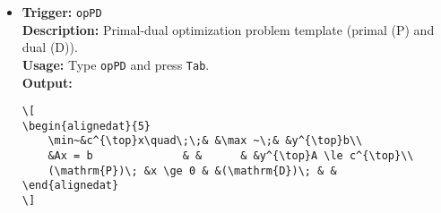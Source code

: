 \documentclass{article}
\begin{document}
\begin{itemize}[leftmargin=*, label={}]
\item \textbf{Trigger:} \texttt{opPD} \\
\textbf{Description:} Primal-dual optimization problem template (primal (P) and dual (D)). \\
\textbf{Usage:} Type \texttt{opPD} and press \texttt{Tab}. \\
\textbf{Output:}
\begin{verbatim}
\[
\begin{alignedat}{5}
    \min~&c^{\top}x\quad\;\;& &\max ~\;& &y^{\top}b\\
    &Ax = b              & &      & &y^{\top}A \le c^{\top}\\
    (\mathrm{P})\; &x \ge 0 & &(\mathrm{D})\; & &      
\end{alignedat}
\]
\end{verbatim}
\end{itemize}
\end{document}
